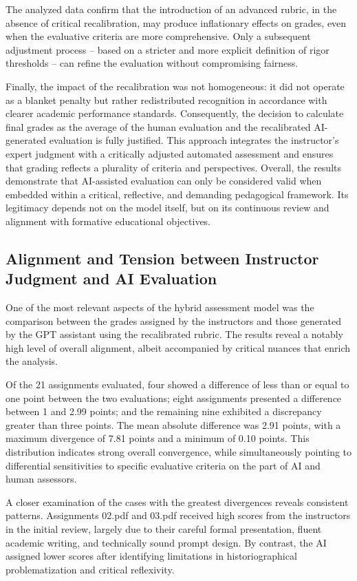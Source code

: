 \documentclass[english]{textolivre}
\begin{document}
The analyzed data confirm that the introduction of an advanced rubric, in the absence of critical recalibration, may produce inflationary effects on grades, even when the evaluative criteria are more comprehensive. Only a subsequent adjustment process -- based on a stricter and more explicit definition of rigor thresholds -- can refine the evaluation without compromising fairness.

Finally, the impact of the recalibration was not homogeneous: it did not operate as a blanket penalty but rather redistributed recognition in accordance with clearer academic performance standards. Consequently, the decision to calculate final grades as the average of the human evaluation and the recalibrated AI-generated evaluation is fully justified. This approach integrates the instructor’s expert judgment with a critically adjusted automated assessment and ensures that grading reflects a plurality of criteria and perspectives. Overall, the results demonstrate that AI-assisted evaluation can only be considered valid when embedded within a critical, reflective, and demanding pedagogical framework. Its legitimacy depends not on the model itself, but on its continuous review and alignment with formative educational objectives.

\subsection{Alignment and Tension between Instructor Judgment and AI Evaluation}
One of the most relevant aspects of the hybrid assessment model was the comparison between the grades assigned by the instructors and those generated by the GPT assistant using the recalibrated rubric. The results reveal a notably high level of overall alignment, albeit accompanied by critical nuances that enrich the analysis.

Of the 21 assignments evaluated, four showed a difference of less than or equal to one point between the two evaluations; eight assignments presented a difference between 1 and 2.99 points; and the remaining nine exhibited a discrepancy greater than three points. The mean absolute difference was 2.91 points, with a maximum divergence of 7.81 points and a minimum of 0.10 points. This distribution indicates strong overall convergence, while simultaneously pointing to differential sensitivities to specific evaluative criteria on the part of AI and human assessors.

A closer examination of the cases with the greatest divergences reveals consistent patterns. Assignments 02.pdf and 03.pdf received high scores from the instructors in the initial review, largely due to their careful formal presentation, fluent academic writing, and technically sound prompt design. By contrast, the AI assigned lower scores after identifying limitations in historiographical problematization and critical reflexivity.
\end{document}
